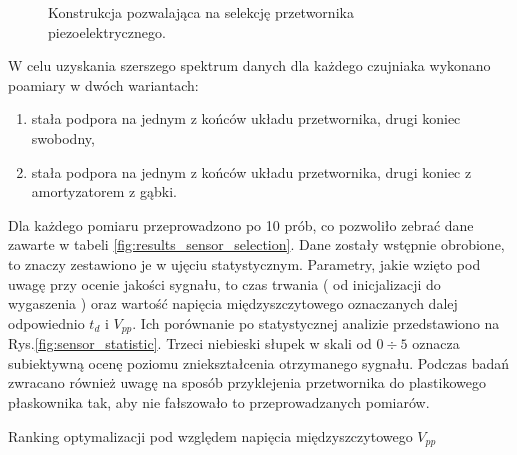 \begin{figure}[htbp]
\centering
{}%
\caption{Konstrukcja pozwalająca na selekcję przetwornika piezoelektrycznego.}
\label{fig:sensor_sel_geometry}
\end{figure}

W celu uzyskania szerszego spektrum danych dla każdego czujniaka wykonano
poamiary w dwóch wariantach: 
\begin{enumerate}
\item stała podpora na jednym z końców układu przetwornika, drugi koniec swobodny,
\item stała podpora na jednym z końców układu przetwornika, drugi koniec z 
amortyzatorem z gąbki.
\end{enumerate}

Dla każdego pomiaru przeprowadzono po 10 prób, co pozwoliło zebrać dane zawarte w tabeli
\ref{fig:results_sensor_selection}. Dane zostały wstępnie obrobione, to znaczy zestawiono
je w ujęciu statystycznym.
Parametry, jakie wzięto pod uwagę przy ocenie jakości sygnału, to czas trwania 
( od inicjalizacji do wygaszenia ) oraz wartość napięcia międzyszczytowego oznaczanych 
dalej odpowiednio $t_d$ i $V_{pp}$. Ich porównanie po statystycznej analizie 
przedstawiono na Rys.\ref{fig:sensor_statistic}. Trzeci niebieski słupek w skali 
od $0\div5$ oznacza subiektywną ocenę poziomu zniekształcenia otrzymanego sygnału. 
Podczas badań zwracano również uwagę na sposób przyklejenia przetwornika do plastikowego 
płaskownika tak, aby nie fałszowało to przeprowadzanych pomiarów. 


\sensorSelTab

\begin{table}[htbp]
  \caption{Ranking optymalizacji pod względem napięcia międzyszczytowego $V_{pp}$}
  \label{fig:sensor_selection_rank_vpp}

  \centering
\end{table}

